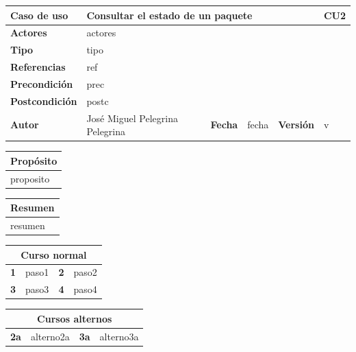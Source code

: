 \documentclass[12pt,spanish]{article}
\begin{document}
\begin{table}[H]
\centering
\begin{tabular}{|m{3cm}|m{4cm}|m{2cm}|m{2cm}|m{2cm}|m{1cm}|}
\hline
\textbf{Caso de uso} &  \multicolumn{4}{m{8cm}|}{Consultar el estado de un paquete} \vline &  \cellcolor{gray!40}CU2 \\
\hline
\textbf{Actores} & \multicolumn{5}{m{8cm}|}{actores} \\
\hline
\textbf{Tipo} & \multicolumn{5}{m{8cm}|}{tipo} \\
\hline
\textbf{Referencias} &\multicolumn{5}{m{8cm}|}{ref} \\
\hline
\textbf{Precondición} & \multicolumn{5}{m{8cm}|}{prec} \\
\hline
\textbf{Postcondición} & \multicolumn{5}{m{8cm}|}{postc} \\
\hline
\textbf{Autor} & José Miguel Pelegrina Pelegrina & \textbf{Fecha} & fecha & \textbf{Versión} & v \\
\hline
\end{tabular}

\vspace{1cm}

\begin{tabular}{|m{16.2cm}|}
\hline
\textbf{Propósito} \\
\hline
proposito \\
\hline
\end{tabular}

\vspace{1cm}

\begin{tabular}{|m{16.2cm}|}
\hline
\textbf{Resumen} \\
\hline
resumen \\
\hline
\end{tabular}

\vspace{1cm}

\begin{tabular}{|m{4pt}|m{7.33cm}|m{4pt}|m{7.33cm}|}
\hline
\multicolumn{4}{|c|}{\textbf{Curso normal}} \\
\hline
\textbf{1} & paso1 & \textbf{2} & paso2 \\
\hline
\textbf{3} & paso3 & \textbf{4} & paso4 \\
\hline
\end{tabular}

\vspace{1cm}

\begin{tabular}{|m{10pt}|m{7.15cm}|m{10pt}|m{7.15cm}|}
\hline
\multicolumn{4}{|c|}{\textbf{Cursos alternos}} \\
\hline
\textbf{2a} & alterno2a & \textbf{3a} & alterno3a  \\
\hline
\end{tabular}


\end{table}
\end{document}
